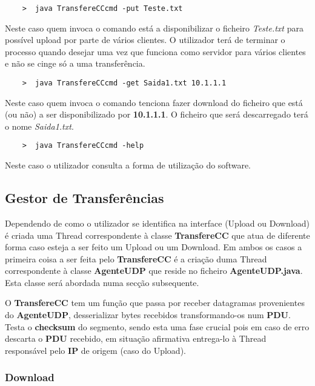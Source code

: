 \documentclass{llncs}
\begin{document}
\begin{verbatim}
	>  java TransfereCCcmd -put Teste.txt
\end{verbatim}

Neste caso quem invoca o comando está a disponibilizar o ficheiro \textit{Teste.txt} para possível upload por parte de vários clientes. O utilizador terá de terminar o processo quando desejar uma vez que funciona como servidor para vários clientes e não se cinge só a uma transferência.

\begin{verbatim}
	>  java TransfereCCcmd -get Saida1.txt 10.1.1.1
\end{verbatim}

Neste caso quem invoca o comando tenciona fazer download do ficheiro que está (ou não) a ser disponibilizado por \textbf{10.1.1.1}. O ficheiro que será descarregado terá o nome \textit{Saida1.txt}.

\begin{verbatim}
	>  java TransfereCCcmd -help
\end{verbatim}

Neste caso o utilizador consulta a forma de utilização do software.


\subsection{Gestor de Transferências}

Dependendo de como o utilizador se identifica na interface (Upload ou Download) é criada uma Thread correspondente à classe \textbf{TransfereCC} que atua de diferente forma caso esteja a ser feito um Upload ou um Download. Em ambos os casos a primeira coisa a ser feita pelo \textbf{TransfereCC} é a criação duma Thread correspondente à classe \textbf{AgenteUDP} que reside no ficheiro \textbf{AgenteUDP.java}. Esta classe será abordada numa secção subsequente.

O \textbf{TransfereCC} tem um função que passa por receber datagramas provenientes do \textbf{AgenteUDP}, desserializar bytes recebidos transformando-os num \textbf{PDU}. Testa o \textbf{checksum} do segmento, sendo esta uma fase crucial pois em caso de erro descarta o \textbf{PDU} recebido, em situação afirmativa entrega-lo à Thread responsável pelo \textbf{IP} de origem (caso do Upload).

\subsubsection{Download}
\end{document}
